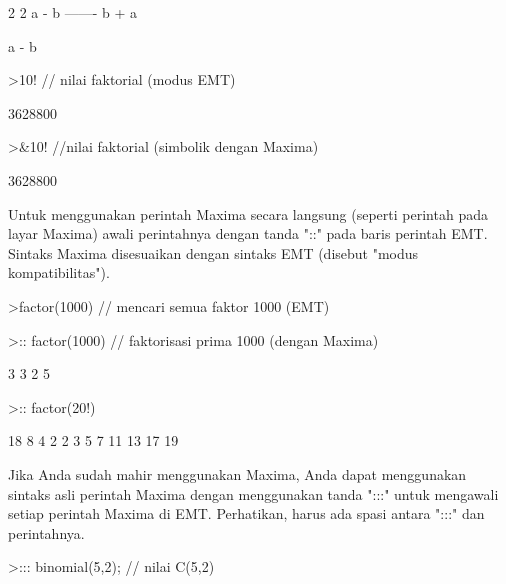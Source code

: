 \documentclass[a4paper,10pt]{article}
\begin{document}
\begin{eulernotebook}
\begin{eulercomment}
\begin{eulercomment}
\begin{euleroutput}
                                  2    2
                                 a  - b
                                 -------
                                  b + a
  
  
                                  a - b
  
\end{euleroutput}
\begin{eulerprompt}
>10! // nilai faktorial (modus EMT)
\end{eulerprompt}
\begin{euleroutput}
  3628800
\end{euleroutput}
\begin{eulerprompt}
>&10! //nilai faktorial (simbolik dengan Maxima)
\end{eulerprompt}
\begin{euleroutput}
  
                                 3628800
  
\end{euleroutput}
\begin{eulercomment}
Untuk menggunakan perintah Maxima secara langsung (seperti perintah pada layar
Maxima) awali perintahnya dengan tanda "::" pada baris perintah EMT. Sintaks
Maxima disesuaikan dengan sintaks EMT (disebut "modus kompatibilitas").
\end{eulercomment}
\begin{eulerprompt}
>factor(1000) // mencari semua faktor 1000 (EMT)
\end{eulerprompt}
\begin{euleroutput}
  [2,  2,  2,  5,  5,  5]
\end{euleroutput}
\begin{eulerprompt}
>:: factor(1000) // faktorisasi prima 1000 (dengan Maxima) 
\end{eulerprompt}
\begin{euleroutput}
  
                                   3  3
                                  2  5
  
\end{euleroutput}
\begin{eulerprompt}
>:: factor(20!)
\end{eulerprompt}
\begin{euleroutput}
  
                          18  8  4  2
                         2   3  5  7  11 13 17 19
  
\end{euleroutput}
\begin{eulercomment}
Jika Anda sudah mahir menggunakan Maxima, Anda dapat menggunakan sintaks asli
perintah Maxima dengan menggunakan tanda ":::" untuk mengawali setiap perintah
Maxima di EMT. Perhatikan, harus ada spasi antara ":::" dan perintahnya.
\end{eulercomment}
\begin{eulerprompt}
>::: binomial(5,2); // nilai C(5,2)
\end{eulerprompt}
\begin{euleroutput}
  

\end{euleroutput}
\end{eulercomment}
\end{eulercomment}
\end{eulernotebook}
\end{document}
